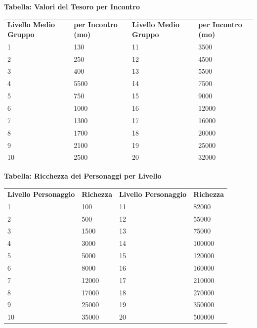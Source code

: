 \documentclass[a4paper,11pt,twoside,openany]{book}
\begin{document}
\bigskip

\textbf{Tabella: Valori del Tesoro per Incontro}

\begin{tabular}{llll}
	\toprule
	\textbf{Livello Medio Gruppo} & \textbf{per Incontro (mo)} & \textbf{Livello Medio Gruppo} & \textbf{per Incontro (mo)}\tabularnewline
	1                             & 130                        & 11                            & 3500\tabularnewline
	2                             & 250                        & 12                            & 4500\tabularnewline
	3                             & 400                        & 13                            & 5500\tabularnewline
	4                             & 5500                       & 14                            & 7500\tabularnewline
	5                             & 750                        & 15                            & 9000\tabularnewline
	6                             & 1000                       & 16                            & 12000\tabularnewline
	7                             & 1300                       & 17                            & 16000\tabularnewline
	8                             & 1700                       & 18                            & 20000\tabularnewline
	9                             & 2100                       & 19                            & 25000\tabularnewline
	10                            & 2500                       & 20                            & 32000\tabularnewline
\end{tabular}
\bigskip

\textbf{Tabella: Ricchezza dei Personaggi per Livello}

\bigskip

\begin{tabular}{llll}
	\toprule
	\textbf{Livello Personaggio} & \textbf{Richezza} & \textbf{ Livello Personaggio} & \textbf{Richezza}\tabularnewline
	1                            & 100               & 11                            & 82000\tabularnewline
	2                            & 500               & 12                            & 55000\tabularnewline
	3                            & 1500              & 13                            & 75000\tabularnewline
	4                            & 3000              & 14                            & 100000\tabularnewline
	5                            & 5000              & 15                            & 120000\tabularnewline
	6                            & 8000              & 16                            & 160000\tabularnewline
	7                            & 12000             & 17                            & 210000\tabularnewline
	8                            & 17000             & 18                            & 270000\tabularnewline
	9                            & 25000             & 19                            & 350000\tabularnewline
	10                           & 35000             & 20                            & 500000\tabularnewline
\end{tabular}
\end{document}
